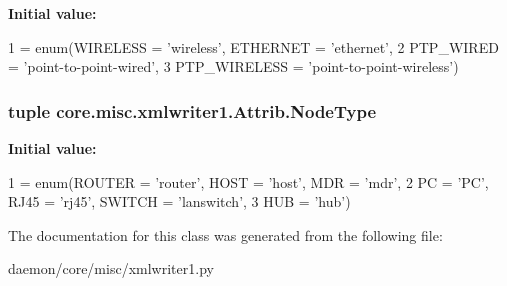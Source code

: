 {\bfseries Initial value\+:}
\begin{DoxyCode}
1 = enum(WIRELESS = \textcolor{stringliteral}{'wireless'}, ETHERNET = \textcolor{stringliteral}{'ethernet'},
2                    PTP\_WIRED = \textcolor{stringliteral}{'point-to-point-wired'},
3                    PTP\_WIRELESS = \textcolor{stringliteral}{'point-to-point-wireless'})
\end{DoxyCode}
\hypertarget{classcore_1_1misc_1_1xmlwriter1_1_1_attrib_a994288366ffa4e207c881f9109155875}{
\subsubsection[{Node\+Type}]{\setlength{\rightskip}{0pt plus 5cm}tuple core.\+misc.\+xmlwriter1.\+Attrib.\+Node\+Type\hspace{0.3cm}{\ttfamily [static]}}}\label{classcore_1_1misc_1_1xmlwriter1_1_1_attrib_a994288366ffa4e207c881f9109155875}
{\bfseries Initial value\+:}
\begin{DoxyCode}
1 = enum(ROUTER = \textcolor{stringliteral}{'router'}, HOST = \textcolor{stringliteral}{'host'}, MDR = \textcolor{stringliteral}{'mdr'},
2                     PC = \textcolor{stringliteral}{'PC'}, RJ45 = \textcolor{stringliteral}{'rj45'}, SWITCH = \textcolor{stringliteral}{'lanswitch'}, 
3                     HUB = \textcolor{stringliteral}{'hub'})
\end{DoxyCode}


The documentation for this class was generated from the following file\+:\begin{DoxyCompactItemize}
\item 
daemon/core/misc/xmlwriter1.\+py\end{DoxyCompactItemize}
